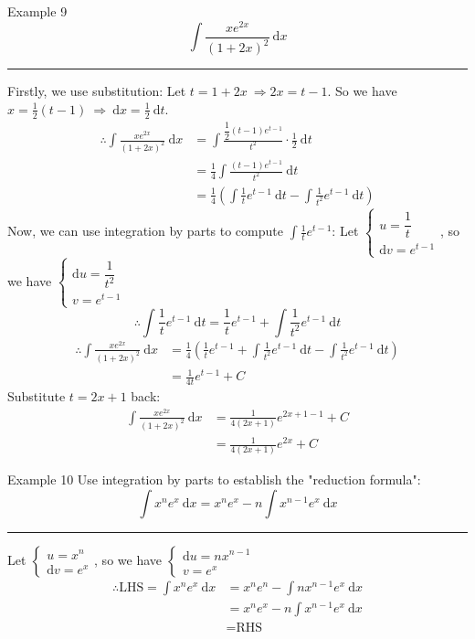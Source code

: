 \documentclass[12pt,a4paper]{article}
\def\d{{\mathrm{d}}}
\begin{document}
\begin{eg}{Example 9}
	$$\int \frac{xe^{2x}}{(1+2x)^2}\ \d x$$
	\noindent\rule[0.25\baselineskip]{\textwidth}{1pt}
	Firstly, we use substitution: Let $t=1+2x\ \Rightarrow 2x=t-1$. So we have $x=\frac{1}{2}(t-1)\ \Rightarrow\ \d x=\frac{1}{2}\ \d t$.
	$$\begin{aligned}
		\therefore \int\frac{xe^{2x}}{(1+2x)^2}\ \d x&=\int\frac{\dfrac{1}{2}(t-1)e^{t-1}}{t^2}\cdot\frac{1}{2}\ \d t\\
		&=\frac{1}{4}\int\frac{(t-1)e^{t-1}}{t^2}\ \d t\\
		&=\frac{1}{4}\left(\int\frac{1}{t}e^{t-1}\ \d t-\int\frac{1}{t^2}e^{t-1}\ \d t\right)
	\end{aligned}$$
	Now, we can use integration by parts to compute $\int\frac{1}{t}e^{t-1}$: Let $\begin{cases}u=\dfrac{1}{t}\\\d v=e^{t-1}\end{cases}$, so we have $\begin{cases}\d u=\dfrac{1}{t^2}\\v=e^{t-1}\end{cases}$
	$$\therefore\int\frac{1}{t}e^{t-1}\ \d t=\frac{1}{t}e^{t-1}+\int\frac{1}{t^2}e^{t-1}\ \d t$$
	$$\begin{aligned}
		\therefore\int \frac{xe^{2x}}{(1+2x)^2}\ \d x&=\frac{1}{4}\left(\frac{1}{t}e^{t-1}+\int\frac{1}{t^2}e^{t-1}\ \d t-\int\frac{1}{t^2}e^{t-1}\ \d t\right)\\
		&=\frac{1}{4t}e^{t-1}+C
	\end{aligned}$$
	Substitute $t=2x+1$ back:
	$$\begin{aligned}
		\int\frac{xe^{2x}}{(1+2x)^2}\ \d x&=\frac{1}{4(2x+1)}e^{2x+1-1}+C\\
		&=\frac{1}{4(2x+1)}e^{2x}+C
	\end{aligned}$$
\end{eg}
\begin{eg}{Example 10}
	Use integration by parts to establish the "reduction formula":
	$$\int x^ne^x\ \d x=x^ne^x-n\int x^{n-1}e^x\ \d x$$
	\noindent\rule[0.25\baselineskip]{\textwidth}{1pt}
	Let $\begin{cases}u=x^n\\\d v=e^x\end{cases}$, so we have $\begin{cases}\d u=nx^{n-1}\\v=e^{x}\end{cases}$
	$$\begin{aligned}
		\therefore \text{LHS}=\int x^ne^x\ \d x&=x^ne^n-\int n x^{n-1}e^x\ \d x\\
		&=x^ne^x-n\int x^{n-1}e^x\ \d x\\
		&=\text{RHS}
	\end{aligned}$$
\end{eg}
\end{document}
